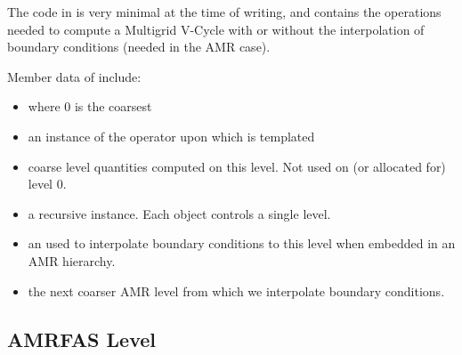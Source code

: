 \documentclass[12pt,a4paper]{article}
\begin{document}
The code in  is very minimal at the time of writing, and contains the operations needed to compute a Multigrid V-Cycle with or without the interpolation of boundary conditions (needed in the AMR case). 

Member data of  include:
\begin{itemize}
\item {} where 0 is the coarsest 
\item {} an instance of the operator upon which  is templated
\item {} coarse level quantities computed on this level. Not used on (or allocated for) level 0. 
\item {} a recursive  instance. Each  object controls a single level.
\item {} an  used to interpolate boundary conditions to this level when embedded in an AMR hierarchy. 
\item {} the next coarser AMR level from which we interpolate boundary conditions. 
\end{itemize}

\pagebreak
\subsection{AMRFAS Level}
\end{document}
